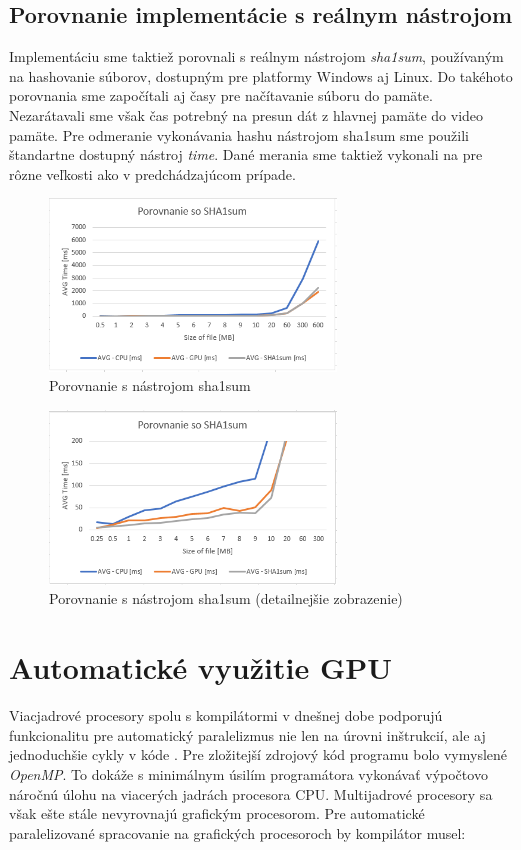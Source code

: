 \documentclass[conference]{IEEEtran}
\begin{document}
\subsection{Porovnanie implementácie s reálnym nástrojom}

Implementáciu sme taktiež porovnali s reálnym nástrojom \textit{sha1sum}, používaným na hashovanie súborov, dostupným pre platformy Windows aj Linux. Do takéhoto porovnania sme započítali aj časy pre načítavanie súboru do pamäte. Nezarátavali sme však čas potrebný na presun dát z hlavnej pamäte do video pamäte. Pre odmeranie vykonávania hashu nástrojom sha1sum sme použili štandartne dostupný nástroj \textit{time}. Dané merania sme taktiež vykonali na pre rôzne veľkosti ako v predchádzajúcom prípade. 

\begin{figure}[h!]
\centering
\includegraphics[width=3in]{img/sha1sum}
\caption{Porovnanie s nástrojom sha1sum}
\end{figure}

\begin{figure}[h!]
\centering
\includegraphics[width=3in]{img/sha1sumdetail}
\caption{Porovnanie s nástrojom sha1sum  (detailnejšie zobrazenie)}
\end{figure}


\section{Automatické využitie GPU}

Viacjadrové procesory spolu s kompilátormi v dnešnej dobe podporujú funkcionalitu pre automatický paralelizmus nie len na úrovni inštrukcií, ale aj jednoduchšie cykly v kóde \cite{automatic}. Pre zložitejší zdrojový kód programu bolo vymyslené \textit{OpenMP}. To dokáže s minimálnym úsilím programátora vykonávať výpočtovo náročnú úlohu na viacerých jadrách procesora CPU.
Multijadrové procesory sa však ešte stále nevyrovnajú grafickým procesorom. Pre automatické paralelizované spracovanie na grafických procesoroch by kompilátor musel:
\end{document}
